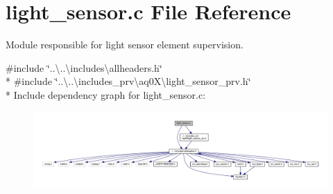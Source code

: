 \hypertarget{a00047}{\section{light\+\_\+sensor.\+c File Reference}
\label{a00047}
}


Module responsible for light sensor element supervision.  


{\ttfamily \#include \char`\"{}..\textbackslash{}..\textbackslash{}includes\textbackslash{}allheaders.\+h\char`\"{}}\\*
{\ttfamily \#include \char`\"{}..\textbackslash{}..\textbackslash{}includes\+\_\+prv\textbackslash{}aq0\+X\textbackslash{}light\+\_\+sensor\+\_\+prv.\+h\char`\"{}}\\*
Include dependency graph for light\+\_\+sensor.\+c\+:\nopagebreak
\begin{figure}[H]
\begin{center}
\leavevmode
\includegraphics[width=350pt]{d8/d19/a00935}
\end{center}
\end{figure}
